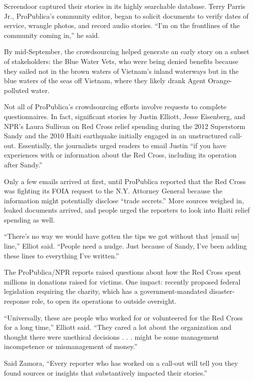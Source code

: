 \documentclass[notoc, symmetric, nobib, nols]{towcenter-guideto-book}
\begin{document}
Screendoor captured their stories in its highly searchable database. Terry Parris Jr., ProPublica's community editor, began to solicit documents to verify dates of service, wrangle photos, and record audio stories. ``I'm on the frontlines of the community coming in,'' he said.%

By mid-September, the crowdsourcing helped generate an early story on a subset of stakeholders: the Blue Water Vets, who were being denied benefits because they sailed not in the brown waters of Vietnam's inland waterways but in the blue waters of the seas off Vietnam, where they likely drank Agent Orange-polluted water.

Not all of ProPublica's crowdsourcing efforts involve requests to complete questionnaires. In fact, significant stories by Justin Elliott, Jesse Eisenberg, and NPR's Laura Sullivan on Red Cross relief spending during the 2012 Superstorm Sandy and the 2010 Haiti earthquake initially engaged in an unstructured call-out. Essentially, the journalists urged readers to email Justin ``if you have experiences with or information about the Red Cross, including its operation after Sandy.''

Only a few emails arrived at first, until ProPublica reported that the Red Cross was fighting its FOIA request to the N.Y. Attorney General because the information might potentially disclose ``trade secrets.'' More sources weighed in, leaked documents arrived, and people urged the reporters to look into Haiti relief spending as well.  

``There's no way we would have gotten the tips we got without that [email us] line,'' Elliot said. ``People need a nudge. Just because of Sandy, I've been adding these lines to everything I've written.''

The ProPublica/NPR reports raised questions about how the Red Cross spent millions in donations raised for victims. One impact: recently proposed federal legislation requiring the charity, which has a government-mandated disaster-response role, to open its operations to outside oversight.

``Universally, these are people who worked for or volunteered for the Red Cross for a long time,'' Elliott said. ``They cared a lot about the organization and thought there were unethical decisions . . . might be some management incompetence or mismanagement of money.''  

Said Zamora, ``Every reporter who has worked on a call-out will tell you they found sources or insights that substantively impacted their stories.''
\end{document}
